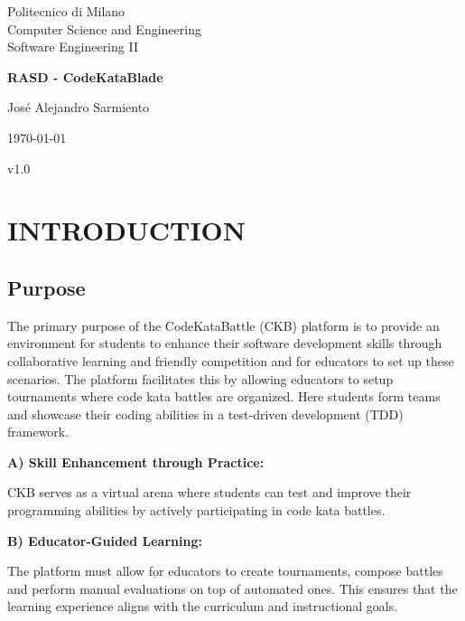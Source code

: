 \documentclass{article}
\begin{document}
\begin{titlepage}
    \begin{center}
        
        Politecnico di Milano\\
      
        Computer Science and Engineering\\
        
        Software Engineering II\\

        \vfill
        
        {\Large \textbf{RASD - CodeKataBlade}}\\
        
        \vfill

        José Alejandro Sarmiento

        \today

        v1.0
        
    \end{center}
\end{titlepage}
\newpage


\tableofcontents


\section{INTRODUCTION}
\subsection{Purpose}

The primary purpose of the CodeKataBattle (CKB) platform is to provide an environment 
for students to enhance their software development skills through collaborative 
learning and friendly competition and for educators to set up these scenarios. The platform facilitates 
this by allowing educators to setup tournaments where code kata battles are organized. Here students 
form teams and showcase their coding abilities in a test-driven development (TDD) framework.

\textbf{A) Skill Enhancement through Practice:}

CKB serves as a virtual arena where students can test and improve their programming abilities by actively 
participating in code kata battles.

\textbf{B) Educator-Guided Learning:}

The platform must allow for educators to create tournaments, compose battles and perform manual evaluations
on top of automated ones. This ensures that the learning experience aligns with the curriculum and instructional goals.
\end{document}
